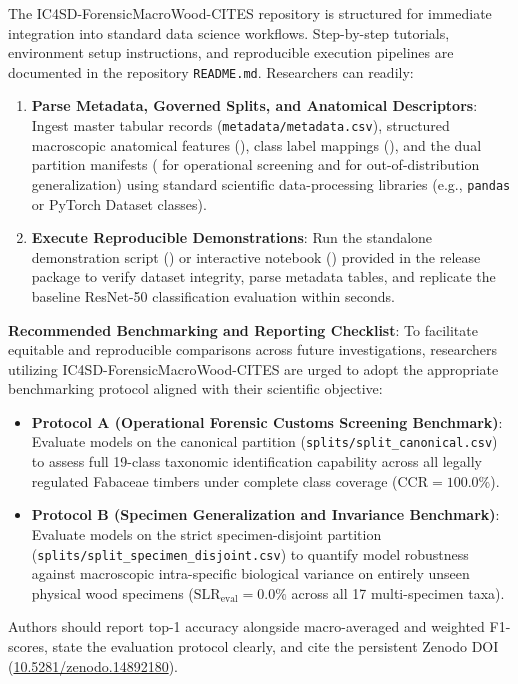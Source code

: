 \documentclass[a4paper,fleqn,12pt]{cas-sc}
\begin{document}
The IC4SD-ForensicMacroWood-CITES repository is structured for immediate integration into standard data science workflows. Step-by-step tutorials, environment setup instructions, and reproducible execution pipelines are documented in the repository \texttt{README.md}. Researchers can readily:
\begin{enumerate}[leftmargin=*,itemsep=2pt,topsep=2pt]
    \item \textbf{Parse Metadata, Governed Splits, and Anatomical Descriptors}: Ingest master tabular records (\texttt{metadata/metadata.csv}), structured macroscopic anatomical features (), class label mappings (), and the dual partition manifests ( for operational screening and  for out-of-distribution generalization) using standard scientific data-processing libraries (e.g., \texttt{pandas} or PyTorch Dataset classes).
    \item \textbf{Execute Reproducible Demonstrations}: Run the standalone demonstration script () or interactive notebook () provided in the release package to verify dataset integrity, parse metadata tables, and replicate the baseline ResNet-50 classification evaluation within seconds.
\end{enumerate}

\noindent
\textbf{Recommended Benchmarking and Reporting Checklist}: To facilitate equitable and reproducible comparisons across future investigations, researchers utilizing IC4SD-ForensicMacroWood-CITES are urged to adopt the appropriate benchmarking protocol aligned with their scientific objective:
\begin{itemize}[leftmargin=*,itemsep=2pt,topsep=2pt]
    \item \textbf{Protocol A (Operational Forensic Customs Screening Benchmark)}: Evaluate models on the canonical partition (\texttt{splits/split\_canonical.csv}) to assess full 19-class taxonomic identification capability across all legally regulated Fabaceae timbers under complete class coverage ($\text{CCR} = 100.0\%$).
    \item \textbf{Protocol B (Specimen Generalization and Invariance Benchmark)}: Evaluate models on the strict specimen-disjoint partition (\texttt{splits/split\_specimen\_disjoint.csv}) to quantify model robustness against macroscopic intra-specific biological variance on entirely unseen physical wood specimens ($\text{SLR}_{\text{eval}} = 0.0\%$ across all 17 multi-specimen taxa).
\end{itemize}
Authors should report top-1 accuracy alongside macro-averaged and weighted F1-scores, state the evaluation protocol clearly, and cite the persistent Zenodo DOI (\href{https://doi.org/10.5281/zenodo.14892180}{10.5281/zenodo.14892180}).
\end{document}
